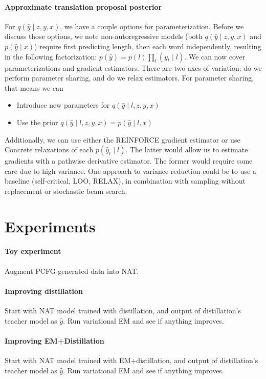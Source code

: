 \documentclass[11pt]{article}
\begin{document}
\paragraph{Approximate translation proposal posterior}
For $q(\hat{y} \mid z, y, x)$, we have a couple options for parameterization.
Before we discuss those options, we note non-autoregressive models (both $q(\hat{y}\mid z,y,x)$
and $p(\hat{y} \mid x)$) require first predicting length, then each word independently,
resulting in the following factorization: $p(\hat{y}) = p(l)\prod_t(y_t \mid l)$.
We can now cover parameterizations and gradient estimators.
There are two axes of variation: do we perform parameter sharing,
and do we relax estimators.
For parameter sharing, that means we can
\begin{itemize}
\item Introduce new parameters for $q(\hat{y} \mid l, z, y, x)$
\item Use the prior $q(\hat{y} \mid l, z, y, x) = p(\hat{y} \mid l, x)$
\end{itemize}
Additionally, we can use either the REINFORCE gradient estimator or
use Concrete relaxations of each $p(\hat{y}_t \mid l)$.
The latter would allow us to estimate gradients with a pathwise derivative estimator.
The former would require some care due to high variance.
One approach to variance reduction could be to use a baseline (self-critical, LOO, RELAX),
in combination with sampling without replacement or stochastic beam search.

\section{Experiments}
\paragraph{Toy experiment}
Augment PCFG-generated data into NAT.

\paragraph{Improving distillation}
Start with NAT model trained with distillation,
and output of distillation's teacher model as $\hat{y}$.
Run variational EM and see if anything improves.

\paragraph{Improving EM+Distillation}
Start with NAT model trained with EM+distillation,
and output of distillation's teacher model as $\hat{y}$.
Run variational EM and see if anything improves.
\end{document}

